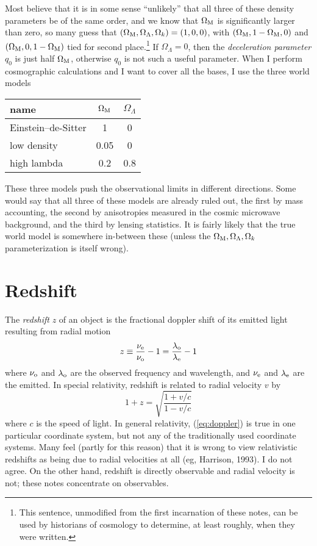 Most believe that it is in some sense ``unlikely'' that all three of
these density parameters be of the same order, and we know that
$\Omega_{\rm M}$ is significantly larger than zero, so many guess that
$(\Omega_{\rm M},\Omega_{\Lambda},\Omega_k)=(1,0,0)$, with
$(\Omega_{\rm M},1-\Omega_{\rm M},0)$ and $(\Omega_{\rm
M},0,1-\Omega_{\rm M})$ tied for second place.\footnote{This sentence,
unmodified from the first incarnation of these notes, can be used by
historians of cosmology to determine, at least roughly, when they were
written.}  If $\Omega_{\Lambda}=0$, then the {\em deceleration
parameter\/} $q_0$ is just half $\Omega_{\rm M}$, otherwise $q_0$ is
not such a useful parameter.  When I perform cosmographic calculations
and I want to cover all the bases, I use the three world models
\begin{center}
\begin{tabular}{lcc}
name & $\Omega_{\rm M}$ & $\Omega_{\Lambda}$ \\ \hline
Einstein--de-Sitter & 1 & 0 \\
low density & 0.05 & 0 \\
high lambda & 0.2 & 0.8 \\
\end{tabular}
\end{center}
These three models push the observational limits in different
directions.  Some would say that all three of these models are already
ruled out, the first by mass accounting, the second by anisotropies
measured in the cosmic microwave background, and the third by lensing
statistics.  It is fairly likely that the true world model is
somewhere in-between these (unless the $\Omega_{\rm
M},\Omega_{\Lambda},\Omega_k$ parameterization is itself wrong).


\section{Redshift}

The {\em redshift\/} $z$ of an object is the fractional doppler shift
of its emitted light resulting from radial motion
\begin{equation}
z\equiv \frac{\nu_{\rm e}}{\nu_{\rm o}}-1 = \frac{\lambda_{\rm o}}{\lambda_{\rm e}}-1
\end{equation}
where $\nu_{\rm o}$ and $\lambda_{\rm o}$ are the observed frequency
and wavelength, and $\nu_{\rm e}$ and $\lambda_{\rm e}$ are the
emitted.  In special relativity, redshift is related to radial
velocity $v$ by
\begin{equation}
\label{eq:doppler}
1+z = \sqrt{\frac{1+v/c}{1-v/c}}
\end{equation}
where $c$ is the speed of light.  In general relativity,
(\ref{eq:doppler}) is true in one particular coordinate system, but
not any of the traditionally used coordinate systems.  Many feel
(partly for this reason) that it is wrong to view relativistic
redshifts as being due to radial velocities at all (eg, Harrison,
1993).  I do not agree.  On the other hand, redshift is directly
observable and radial velocity is not; these notes concentrate on
observables.

